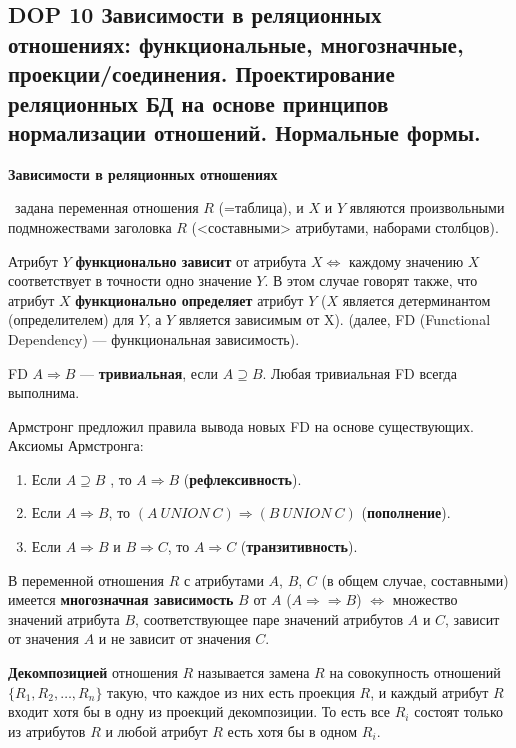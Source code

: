 \subsection{DOP 10 Зависимости  в  реляционных  отношениях:  функциональные,  многозначные,  проекции/соединения. Проектирование реляционных БД на основе принципов нормализации отношений. Нормальные формы.}

\textbf{Зависимости в реляционных отношениях}

\mathLet \ задана переменная отношения $R$ (=таблица), и $X$ и $Y$ являются произвольными подмножествами заголовка $R$ (<составными> атрибутами, наборами столбцов).

Атрибут $Y$ \textbf{функционально зависит} от атрибута $X \iff$ каждому значению $X$ соответствует в точности одно значение $Y$.
В этом случае говорят также, что атрибут $X$ \textbf{функционально определяет} атрибут $Y$ ($X$ является детерминантом (определителем) для $Y$, а $Y$ является зависимым от X). (далее, FD (Functional Dependency) --- функциональная зависимость).

FD $A \Rightarrow B$ --- \textbf{тривиальная}, если $A \supseteq B$.
Любая тривиальная FD всегда выполнима.

Армстронг предложил правила вывода новых FD на основе существующих.
Аксиомы Армстронга:
\begin{enumerate}
    \item Если $A \supseteq B$ , то $A \Rightarrow B$ (\textbf{рефлексивность}).
    \item Если $A \Rightarrow B$, то $(A~UNION~C) \Rightarrow (B~UNION~C)$ (\textbf{пополнение}).
    \item Если $A \Rightarrow B$ и $B \Rightarrow C$, то $A \Rightarrow C$ (\textbf{транзитивность}).
\end{enumerate}


В переменной отношения $R$ с атрибутами $A$, $B$, $C$ (в общем случае, составными) имеется \textbf{многозначная зависимость} $B$ от $A$ ($A \Rightarrow\Rightarrow B$) $\iff$ множество значений атрибута $B$, соответствующее паре значений атрибутов $A$ и $C$, зависит от значения $A$ и не зависит от значения $C$.

\textbf{Декомпозицией} отношения $R$ называется замена $R$ на совокупность отношений $\{R_1, R_2, \dots , R_n\}$ такую, что каждое из них есть проекция $R$, и каждый атрибут $R$ входит хотя бы в одну из проекций декомпозиции.
То есть все $R_i$ состоят только из атрибутов $R$ и любой атрибут $R$ есть хотя бы в одном $R_i$.

